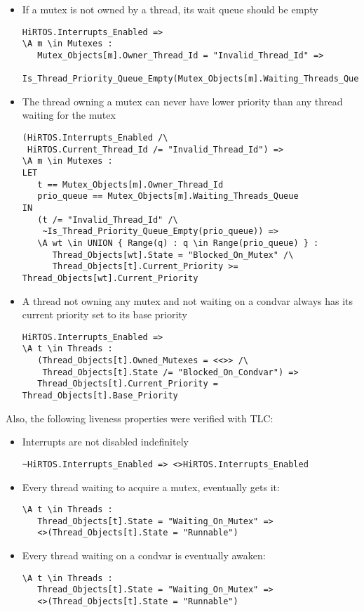 \documentclass[11pt,letterpaper,twoside,openany]{book}
\begin{document}
\begin{itemize}
\item If a mutex is not owned by a thread, its wait queue should be empty
\begin{lstlisting}
HiRTOS.Interrupts_Enabled =>
\A m \in Mutexes :
   Mutex_Objects[m].Owner_Thread_Id = "Invalid_Thread_Id" =>
      Is_Thread_Priority_Queue_Empty(Mutex_Objects[m].Waiting_Threads_Queue)
\end{lstlisting}

\item The thread owning a mutex can never have lower priority than any thread waiting
for the mutex
\begin{lstlisting}
(HiRTOS.Interrupts_Enabled /\
 HiRTOS.Current_Thread_Id /= "Invalid_Thread_Id") =>
\A m \in Mutexes :
LET
   t == Mutex_Objects[m].Owner_Thread_Id
   prio_queue == Mutex_Objects[m].Waiting_Threads_Queue
IN
   (t /= "Invalid_Thread_Id" /\
    ~Is_Thread_Priority_Queue_Empty(prio_queue)) =>
   \A wt \in UNION { Range(q) : q \in Range(prio_queue) } :
      Thread_Objects[wt].State = "Blocked_On_Mutex" /\
      Thread_Objects[t].Current_Priority >= Thread_Objects[wt].Current_Priority
\end{lstlisting}

\item A thread not owning any mutex and not waiting on a condvar always has its current
priority set to its base priority
\begin{lstlisting}
HiRTOS.Interrupts_Enabled =>
\A t \in Threads :
   (Thread_Objects[t].Owned_Mutexes = <<>> /\
    Thread_Objects[t].State /= "Blocked_On_Condvar") =>
   Thread_Objects[t].Current_Priority = Thread_Objects[t].Base_Priority
\end{lstlisting}
\end{itemize}

Also, the following liveness properties were verified with TLC:

\begin{itemize}
\item Interrupts are not disabled indefinitely
\begin{lstlisting}
~HiRTOS.Interrupts_Enabled => <>HiRTOS.Interrupts_Enabled
\end{lstlisting}

\item Every thread waiting to acquire a mutex, eventually gets it:
\begin{lstlisting}
\A t \in Threads :
   Thread_Objects[t].State = "Waiting_On_Mutex" =>
   <>(Thread_Objects[t].State = "Runnable")
\end{lstlisting}

\item Every thread waiting on a condvar is eventually awaken:
\begin{lstlisting}
\A t \in Threads :
   Thread_Objects[t].State = "Waiting_On_Mutex" =>
   <>(Thread_Objects[t].State = "Runnable")
\end{lstlisting}
\end{itemize}
\end{document}
